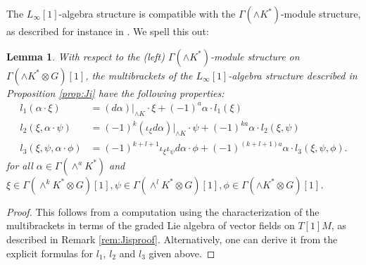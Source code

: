 \documentclass[11pt,thmsa]{amsart}
\newtheorem{lemma}[theorem]{Lemma}
\theoremstyle{definition}
\begin{document}
 

 



 The $L_{\infty}[1]$-algebra structure is compatible with the 
$\Gamma(\wedge K^*)$-module structure, as described for instance in \cite[Theorem 2.4 and 2.5]{VitaglianoFol}. We spell this out:
 
\begin{lemma}\label{lem:Jider}
With respect to the (left) $\Gamma(\wedge K^*)$-module structure on $\Gamma(\wedge K^*\otimes G)[1]$,
the multibrackets of the $L_{\infty}[1]$-algebra structure described in Proposition \ref{prop:Ji} have the following properties:  
\begin{align*}
  l_1(\alpha\cdot \xi)&=(d\alpha)|_{\wedge K}\cdot \xi+ (-1)^{a}\alpha \cdot l_1(\xi)\\
 l_2( \xi, \alpha\cdot \psi)&=(-1)^{k}(\iota_{\xi} d\alpha)|_{\wedge K}\cdot \psi+ (-1)^{ka}\alpha \cdot l_2(\xi,\psi)\\
  l_3(\xi, \psi, \alpha\cdot  \phi)&=(-1)^{k+l+1}\iota_{\xi}\iota_{\psi} d\alpha\cdot \phi + (-1)^{(k+l+1)a}\alpha \cdot l_3(\xi, \psi,\phi).
\end{align*}
for all $\alpha \in \Gamma(\wedge^a K^*)$ and 
 $\xi \in \Gamma(\wedge^k K^*\otimes G)[1], \psi \in \Gamma(\wedge^l K^*\otimes G)[1],
 \phi \in \Gamma(\wedge K^*\otimes G)[1]$.
 \end{lemma}
\begin{proof}
This follows from a computation using the characterization of the  multibrackets in terms of  the graded Lie algebra of vector fields on $T[1]M$, as described in Remark \ref{rem:Jisproof}.
Alternatively, one can derive it from the explicit formulas for $l_1$, $l_2$ and $l_3$ given above.
\end{proof}
 
\end{document}
